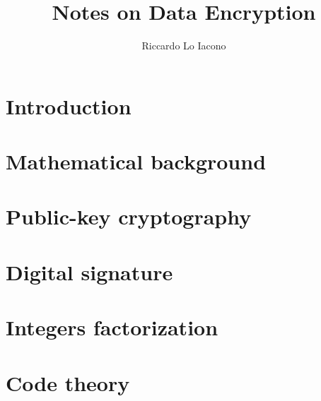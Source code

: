 \documentclass[draft]{lectures2}
\title{Notes on Data Encryption}
\author{Riccardo Lo Iacono}
\begin{document}
    \maketitle

    \section{Introduction}
    

    \section{Mathematical background}
    

    \section{Public-key cryptography}
    

    \section{Digital signature}
    

    \section{Integers factorization}
    

    \section{Code theory}
    

    \printbibliography
    \printglossaries
\end{document}
